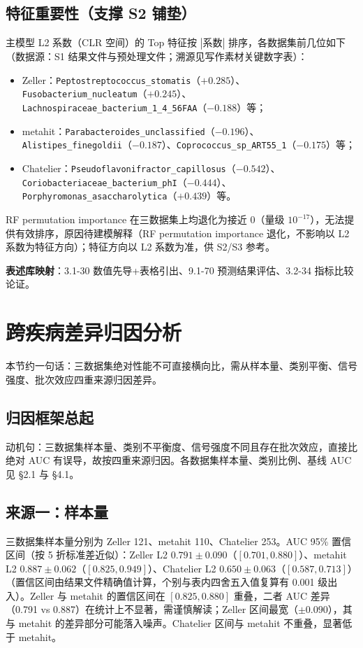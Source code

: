 \documentclass{internal-report}
\begin{document}
\subsection{特征重要性（支撑 S2 铺垫）}
主模型 L2 系数（CLR 空间）的 Top 特征按 $|\text{系数}|$ 排序，各数据集前几位如下（数据源：S1 结果文件与预处理文件；溯源见写作素材关键数字表）：
\begin{itemize}
  \item Zeller：\texttt{Peptostreptococcus\_stomatis}（$+0.285$）、\texttt{Fusobacterium\_nucleatum}（$+0.245$）、\texttt{Lachnospiraceae\_bacterium\_1\_4\_56FAA}（$-0.188$）等；
  \item metahit：\texttt{Parabacteroides\_unclassified}（$-0.196$）、\texttt{Alistipes\_finegoldii}（$-0.187$）、\texttt{Coprococcus\_sp\_ART55\_1}（$-0.175$）等；
  \item Chatelier：\texttt{Pseudoflavonifractor\_capillosus}（$-0.542$）、\texttt{Coriobacteriaceae\_bacterium\_phI}（$-0.444$）、\texttt{Porphyromonas\_asaccharolytica}（$+0.439$）等。
\end{itemize}
RF permutation importance 在三数据集上均退化为接近 0（量级 $10^{-17}$），无法提供有效排序，原因待建模解释（RF permutation importance 退化，不影响以 L2 系数为特征方向）；特征方向以 L2 系数为准，供 S2/S3 参考。

\textbf{表述库映射}：3.1-30 数值先导+表格引出、9.1-70 预测结果评估、3.2-34 指标比较论证。

\section{跨疾病差异归因分析}
\label{sec:attribution}

本节约一句话：三数据集绝对性能不可直接横向比，需从样本量、类别平衡、信号强度、批次效应四重来源归因差异。

\subsection{归因框架总起}
动机句：三数据集样本量、类别不平衡度、信号强度不同且存在批次效应，直接比绝对 AUC 有误导，故按四重来源归因。各数据集样本量、类别比例、基线 AUC 见 §2.1 与 §4.1。

\subsection{来源一：样本量}
三数据集样本量分别为 Zeller 121、metahit 110、Chatelier 253。AUC 95\% 置信区间（按 5 折标准差近似）：Zeller L2 $0.791\pm0.090$（$[0.701,0.880]$）、metahit L2 $0.887\pm0.062$（$[0.825,0.949]$）、Chatelier L2 $0.650\pm0.063$（$[0.587,0.713]$）（置信区间由结果文件精确值计算，个别与表内四舍五入值复算有 0.001 级出入）。Zeller 与 metahit 的置信区间在 $[0.825,0.880]$ 重叠，二者 AUC 差异（0.791 vs 0.887）在统计上不显著，需谨慎解读；Zeller 区间最宽（$\pm0.090$），其与 metahit 的差异部分可能落入噪声。Chatelier 区间与 metahit 不重叠，显著低于 metahit。
\end{document}
